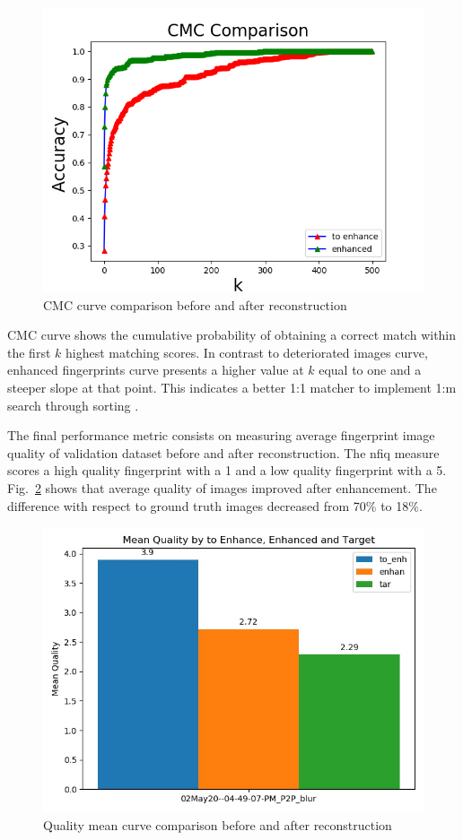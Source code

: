 \documentclass[a4paper,fleqn]{cas-dc}
\begin{document}
\begin{figure}[htbp]
\centerline{\includegraphics[scale=0.4]{figs/cmc_comparison.png}}
\caption{CMC curve comparison before and after reconstruction}
\label{fig10}
\end{figure}

CMC curve shows the cumulative probability of obtaining a correct match within the first $k$ highest matching scores. In contrast to deteriorated images curve, enhanced fingerprints curve presents a higher value at $k$ equal to one and a steeper slope at that point. This indicates a better 1:1 matcher to implement 1:m search through
sorting \cite{RROCCMC}.

The final performance metric consists on measuring average fingerprint image quality of validation dataset before and after reconstruction. The nfiq measure scores a high quality fingerprint with a 1 and a low quality fingerprint with a 5. Fig.~\ref{fig11} shows that average quality of images improved after enhancement. The difference with respect to ground truth images decreased from 70\% to 18\%.

\begin{figure}[htbp]
\centerline{\includegraphics[scale=0.4]{figs/mean_qualities.jpg}}
\caption{Quality mean curve comparison before and after reconstruction}
\label{fig11}
\end{figure}
\end{document}
